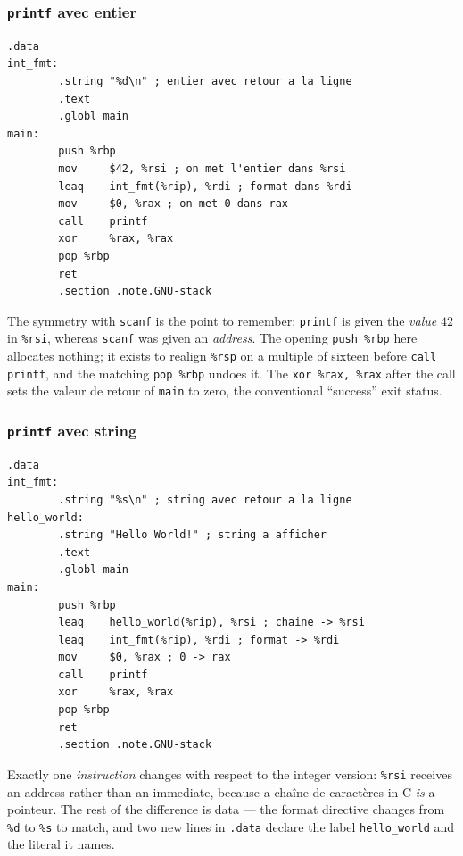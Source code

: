 \subsubsection{\texttt{printf} avec entier}
\begin{lstlisting}[language=gas]
        .data
int_fmt:
        .string "%d\n" ; entier avec retour a la ligne
        .text
        .globl main
main:
        push %rbp
        mov     $42, %rsi ; on met l'entier dans %rsi
        leaq    int_fmt(%rip), %rdi ; format dans %rdi
        mov     $0, %rax ; on met 0 dans rax
        call    printf
        xor     %rax, %rax
        pop %rbp
        ret
        .section .note.GNU-stack
\end{lstlisting}

The symmetry with \texttt{scanf} is the point to remember: \texttt{printf} is
given the \emph{value} $42$ in \texttt{\%rsi}, whereas \texttt{scanf} was given
an \emph{address}. The opening \texttt{push \%rbp} here allocates nothing; it
exists to realign \texttt{\%rsp} on a multiple of sixteen before
\texttt{call printf}, and the matching \texttt{pop \%rbp} undoes it. The
\texttt{xor \%rax, \%rax} after the call sets the valeur de retour of
\texttt{main} to zero, the conventional ``success'' exit status.

\subsubsection{\texttt{printf} avec string}
\begin{lstlisting}[language=gas]
        .data
int_fmt:
        .string "%s\n" ; string avec retour a la ligne
hello_world:
        .string "Hello World!" ; string a afficher
        .text
        .globl main
main:
        push %rbp
        leaq    hello_world(%rip), %rsi ; chaine -> %rsi
        leaq    int_fmt(%rip), %rdi ; format -> %rdi
        mov     $0, %rax ; 0 -> rax
        call    printf
        xor     %rax, %rax
        pop %rbp
        ret
        .section .note.GNU-stack
\end{lstlisting}

Exactly one \emph{instruction} changes with respect to the integer version:
\texttt{\%rsi} receives an address rather than an immediate, because a chaîne de
caractères in C \emph{is} a pointeur. The rest of the difference is data --- the
format directive
changes from \texttt{\%d} to \texttt{\%s} to match, and two new lines in
\texttt{.data} declare the label \texttt{hello\_world} and the literal it names.

